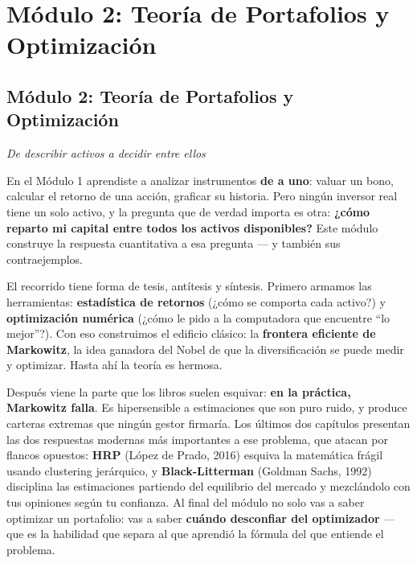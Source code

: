 \documentclass[
  spanish,
  letterpaper,
  DIV=11,
  numbers=noendperiod]{scrreprt}
\begin{document}
\label{refs}

\part{Módulo 2: Teoría de Portafolios y Optimización}

\chapter*{Módulo 2: Teoría de Portafolios y
Optimización}\label{muxf3dulo-2-teoruxeda-de-portafolios-y-optimizaciuxf3n-1}


\emph{De describir activos a decidir entre ellos}

En el Módulo 1 aprendiste a analizar instrumentos \textbf{de a uno}:
valuar un bono, calcular el retorno de una acción, graficar su historia.
Pero ningún inversor real tiene un solo activo, y la pregunta que de
verdad importa es otra: \textbf{¿cómo reparto mi capital entre todos los
activos disponibles?} Este módulo construye la respuesta cuantitativa a
esa pregunta --- y también sus contraejemplos.

El recorrido tiene forma de tesis, antítesis y síntesis. Primero armamos
las herramientas: \textbf{estadística de retornos} (¿cómo se comporta
cada activo?) y \textbf{optimización numérica} (¿cómo le pido a la
computadora que encuentre ``lo mejor''?). Con eso construimos el
edificio clásico: la \textbf{frontera eficiente de Markowitz}, la idea
ganadora del Nobel de que la diversificación se puede medir y optimizar.
Hasta ahí la teoría es hermosa.

Después viene la parte que los libros suelen esquivar: \textbf{en la
práctica, Markowitz falla}. Es hipersensible a estimaciones que son puro
ruido, y produce carteras extremas que ningún gestor firmaría. Los
últimos dos capítulos presentan las dos respuestas modernas más
importantes a ese problema, que atacan por flancos opuestos:
\textbf{HRP} (López de Prado, 2016) esquiva la matemática frágil usando
clustering jerárquico, y \textbf{Black-Litterman} (Goldman Sachs, 1992)
disciplina las estimaciones partiendo del equilibrio del mercado y
mezclándolo con tus opiniones según tu confianza. Al final del módulo no
solo vas a saber optimizar un portafolio: vas a saber \textbf{cuándo
desconfiar del optimizador} --- que es la habilidad que separa al que
aprendió la fórmula del que entiende el problema.
\end{document}
